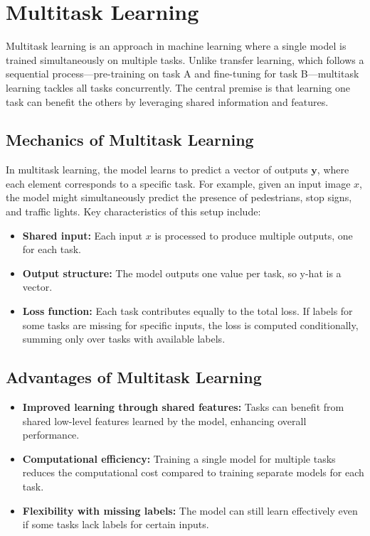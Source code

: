 \documentclass[12pt,openany]{book}
\begin{document}
\section{Multitask Learning}

Multitask learning is an approach in machine learning where a single model is trained simultaneously on multiple tasks. Unlike transfer learning, which follows a sequential process—pre-training on task A and fine-tuning for task B—multitask learning tackles all tasks concurrently. The central premise is that learning one task can benefit the others by leveraging shared information and features.

\subsection{Mechanics of Multitask Learning}

In multitask learning, the model learns to predict a vector of outputs \( \mathbf{y} \), where each element corresponds to a specific task. For example, given an input image \( x \), the model might simultaneously predict the presence of pedestrians, stop signs, and traffic lights. Key characteristics of this setup include:
\begin{itemize}
    \item \textbf{Shared input:} Each input \( x \) is processed to produce multiple outputs, one for each task.
    \item \textbf{Output structure:} The model outputs one value per task, so y-hat is a vector.
    \item \textbf{Loss function:} Each task contributes equally to the total loss. If labels for some tasks are missing for specific inputs, the loss is computed conditionally, summing only over tasks with available labels.
\end{itemize}

\subsection{Advantages of Multitask Learning}

\begin{itemize}
    \item \textbf{Improved learning through shared features:} Tasks can benefit from shared low-level features learned by the model, enhancing overall performance.
    \item \textbf{Computational efficiency:} Training a single model for multiple tasks reduces the computational cost compared to training separate models for each task.
    \item \textbf{Flexibility with missing labels:} The model can still learn effectively even if some tasks lack labels for certain inputs.
\end{itemize}
\end{document}
